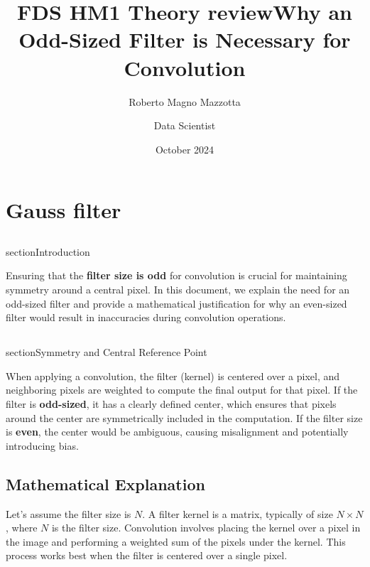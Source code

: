 \documentclass{article}
\title{FDS HM1 Theory review}
\author{Roberto Magno Mazzotta}
\date{October 2024}
\begin{document}
\maketitle

\section{Gauss filter}



\title{Why an Odd-Sized Filter is Necessary for Convolution}
\author{Data Scientist}



\maketitle

\subsection{}section{Introduction}

Ensuring that the \textbf{filter size is odd} for convolution is crucial for maintaining symmetry around a central pixel. In this document, we explain the need for an odd-sized filter and provide a mathematical justification for why an even-sized filter would result in inaccuracies during convolution operations.

\subsection{}section{Symmetry and Central Reference Point}

When applying a convolution, the filter (kernel) is centered over a pixel, and neighboring pixels are weighted to compute the final output for that pixel. If the filter is \textbf{odd-sized}, it has a clearly defined center, which ensures that pixels around the center are symmetrically included in the computation. If the filter size is \textbf{even}, the center would be ambiguous, causing misalignment and potentially introducing bias.

\subsection{Mathematical Explanation}

Let’s assume the filter size is $N$. A filter kernel is a matrix, typically of size $N \times N$, where $N$ is the filter size. Convolution involves placing the kernel over a pixel in the image and performing a weighted sum of the pixels under the kernel. This process works best when the filter is centered over a single pixel.
\end{document}
